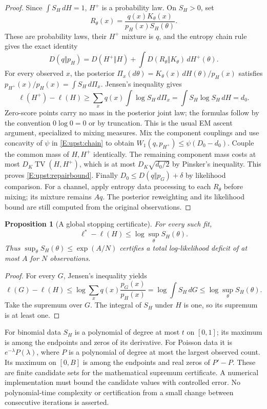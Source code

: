 \documentclass[11pt,a4paper]{article}
\newtheorem{proposition}[theorem]{Proposition}
\theoremstyle{definition}
\theoremstyle{remark}
\numberwithin{equation}{section}
\begin{document}
\begin{proof}
Since $\int S_H\,dH=1$, $H^+$ is a probability law. On $S_H>0$, set
\[
 R_\theta(x)=\frac{q(x)K_\theta(x)}{p_H(x)S_H(\theta)}.
\]
These are probability laws, their $H^+$ mixture is $q$, and the entropy
chain rule gives the exact identity
\begin{equation}\label{E:upst:chain}
 D(q\Vert p_H)=D(H^+\Vert H)
       +\int D(R_\theta\Vert K_\theta)\,dH^+(\theta).
\end{equation}
For every observed $x$, the posterior
$\Pi_x(d\theta)=K_\theta(x)\,dH(\theta)/p_H(x)$ satisfies
$p_{H^+}(x)/p_H(x)=\int S_H\,d\Pi_x$. Jensen's inequality gives
\[
 \ell(H^+)-\ell(H)
 \ge\sum_xq(x)\int\log S_H\,d\Pi_x
 =\int S_H\log S_H\,dH=d_0.
\]
Zero-score points carry no mass in the posterior joint law; the
formulas follow by the convention $0\log0=0$ or by truncation.
This is the usual EM ascent argument, specialized to mixing measures.
Mix the component couplings and use concavity of $\psi$ in
\eqref{E:upst:chain} to obtain
$W_1(q,p_{H^+})\le\psi(D_0-d_0)$.
Couple the common mass of $H,H^+$ identically. The remaining component
mass costs at most $D_K\operatorname{TV}(H,H^+)$, which is at most
$D_K\sqrt{d_0/2}$ by Pinsker's inequality. This proves
\eqref{E:upst:repairbound}. Finally
$D_0\le D(q\Vert p_G)+\delta$ by likelihood comparison.
For a channel, apply entropy data processing to each $R_\theta$ before
mixing; its mixture remains $Aq$. The posterior reweighting and its
likelihood bound are still computed from the original observations.
\end{proof}

\begin{proposition}[A global stopping certificate]
\label{E:upst:certificate}
For every such fit,
\begin{equation}\label{E:upst:scoregap}
 \ell^*-\ell(H)\le\log\sup_\theta S_H(\theta).
\end{equation}
Thus $\sup_\theta S_H(\theta)\le\exp(A/N)$ certifies a total
log-likelihood deficit of at most $A$ for $N$ observations.
\end{proposition}
\begin{proof}
For every $G$, Jensen's inequality yields
\[
 \ell(G)-\ell(H)
 \le\log\sum_xq(x)\frac{p_G(x)}{p_H(x)}
 =\log\int S_H\,dG\le\log\sup_\theta S_H(\theta).
\]
Take the supremum over $G$. The integral of $S_H$ under $H$ is one,
so its supremum is at least one.
\end{proof}

For binomial data $S_H$ is a polynomial of degree at most $t$ on
$[0,1]$; its maximum is among the endpoints and zeros of its derivative.
For Poisson data it is $e^{-\lambda}P(\lambda)$, where $P$ is a
polynomial of degree at most the largest observed count. Its maximum
on $[0,B]$ is among the endpoints and real zeros of $P'-P$.
These are finite candidate sets for the mathematical supremum certificate.
A numerical implementation must bound the candidate values with controlled
error. No polynomial-time complexity or certification from a small change
between consecutive iterations is asserted.
\end{document}
